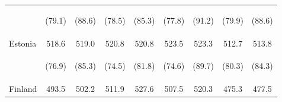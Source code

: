 \begin{center}
\begin{tabular}{lcccccccc}
 & \begin{footnotesize}(79.1)\end{footnotesize} & \begin{footnotesize}(88.6)\end{footnotesize} & \begin{footnotesize}(78.5)\end{footnotesize} & \begin{footnotesize}(85.3)\end{footnotesize} & \begin{footnotesize}(77.8)\end{footnotesize} & \begin{footnotesize}(91.2)\end{footnotesize} & \begin{footnotesize}(79.9)\end{footnotesize} & \begin{footnotesize}(88.6)\end{footnotesize}\\
\noalign{\smallskip}Estonia & 518.6 & 519.0 & 520.8 & 520.8 & 523.5 & 523.3 & 512.7 & 513.8\\
 & \begin{footnotesize}(76.9)\end{footnotesize} & \begin{footnotesize}(85.3)\end{footnotesize} & \begin{footnotesize}(74.5)\end{footnotesize} & \begin{footnotesize}(81.8)\end{footnotesize} & \begin{footnotesize}(74.6)\end{footnotesize} & \begin{footnotesize}(89.7)\end{footnotesize} & \begin{footnotesize}(80.3)\end{footnotesize} & \begin{footnotesize}(84.3)\end{footnotesize}\\
\noalign{\smallskip}Finland & 493.5 & 502.2 & 511.9 & 527.6 & 507.5 & 520.3 & 475.3 & 477.5\\

\end{tabular}
\end{center}
